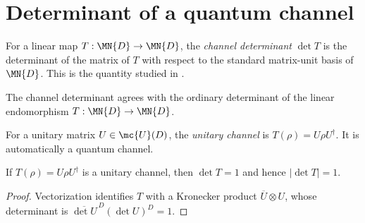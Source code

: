 
\section{Determinant of a quantum channel}
\label{sec:channel_determinant}


\begin{definition}\label{def:channel_det}
    \leanok
    For a linear map $T : \MN{D} \to \MN{D}$, the
    \emph{channel determinant} $\det T$ is the determinant of the
    matrix of $T$ with respect to the standard matrix-unit basis
    of $\MN{D}$.
    This is the quantity studied in \cite[Section~6.1]{Wolf2012Quantum}.
\end{definition}

\begin{remark}
    \label{rem:channel_det_linearMap_det}
    \leanok
    The channel determinant agrees with the ordinary determinant of the linear
    endomorphism $T : \MN{D} \to \MN{D}$.
\end{remark}

\begin{definition}\label{def:unitary_channel}
    \leanok
    For a unitary matrix $U \in \mc{U}(D)$, the
    \emph{unitary channel} is $T(\rho) = U\rho U^\dagger$.
    It is automatically a quantum channel.
\end{definition}

\begin{theorem}
    \label{thm:channel_det_unitary_eq_one}
    \leanok
    If $T(\rho) = U\rho U^\dagger$ is a unitary channel, then
    $\det T = 1$ and hence $|\det T| = 1$.
\end{theorem}

\begin{proof}\leanok
    Vectorization identifies $T$ with a Kronecker product
    $\overline U \otimes U$, whose determinant is
    $\overline{\det U}^{\,D}(\det U)^D = 1$.
\end{proof}

